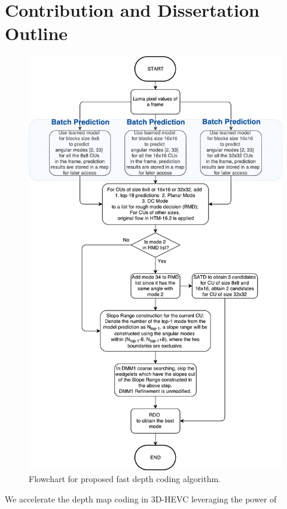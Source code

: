 \section{Contribution and Dissertation Outline}\label{sec:outline}
\begin{figure}
    \centering
    \includegraphics[width=\textwidth,height=\textheight,keepaspectratio]{Figures/proposed-fast-depth-coding-algorithm}
    \caption[Flowchart for proposed fast depth coding algorithm]
    {Flowchart for proposed fast depth coding algorithm.}
    \label{fig:proposed-fast-depth-coding-algorithm}
\end{figure}
We accelerate the depth map coding in 3D-HEVC leveraging the power of
